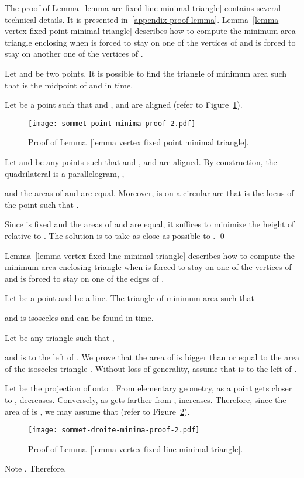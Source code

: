 \documentclass[11pt, oneside]{article}
\begin{document}
The proof of Lemma~\ref{lemma arc fixed line minimal triangle}
contains several technical details.
It is presented in~\ref{appendix proof lemma}.
Lemma~\ref{lemma vertex fixed point minimal triangle}
describes how to compute the minimum-area triangle enclosing 
when  is forced to stay on one of the vertices of 
and  is forced to stay on another one of the vertices of .
\begin{lemma}
\label{lemma vertex fixed point minimal triangle}
Let  and  be two points.
It is possible to find the triangle 
of minimum area such that 
 is the midpoint of 
and 
in  time.
\end{lemma}

\proof Let  be a point such that 
and ,  and  are aligned
(refer to Figure~\ref{sommet-point-minima-proof-2}).
\begin{figure}
\centering
\texttt{[image: sommet-point-minima-proof-2.pdf]}
\caption{Proof of Lemma~\ref{lemma vertex fixed point minimal triangle}.\label{sommet-point-minima-proof-2}}
\end{figure}
Let  and  be any points such that 
 and ,  and  are aligned.
By construction,
the quadrilateral  is a parallelogram,
,

and the areas of  and  are equal.
Moreover,
 is on a circular arc
that is the locus of the point 
such that .

Since  is fixed and the areas of  and  are equal,
it suffices to minimize the height of  relative to .
The solution is to take  as close as possible to .
\qed

Lemma~\ref{lemma vertex fixed line minimal triangle}
describes how to compute the minimum-area enclosing triangle
when  is forced to stay on one of the vertices of 
and  is forced to stay on one of the edges of .
\begin{lemma}
\label{lemma vertex fixed line minimal triangle}
Let  be a point
and  be a line.
The triangle 
of minimum area such that 

and 
is isosceles
and can be found
in  time.
\end{lemma}


\proof
Let  be any triangle such that ,

and  is to the left of .
We prove that the area of  is bigger than or equal to the area of the isosceles triangle .
Without loss of generality,
assume that  is to the left of .

Let  be the projection of  onto .
From elementary geometry,
as a point  gets closer to ,
 decreases.
Conversely,
as  gets farther from ,
 increases.
Therefore,
since the area of  is ,
we may assume that 
(refer to Figure~\ref{sommet-droite-minima-proof-2}).
\begin{figure}
\centering
\texttt{[image: sommet-droite-minima-proof-2.pdf]}
\caption{Proof of Lemma~\ref{lemma vertex fixed line minimal triangle}.\label{sommet-droite-minima-proof-2}}
\end{figure}
Note .
Therefore,
\end{document}
